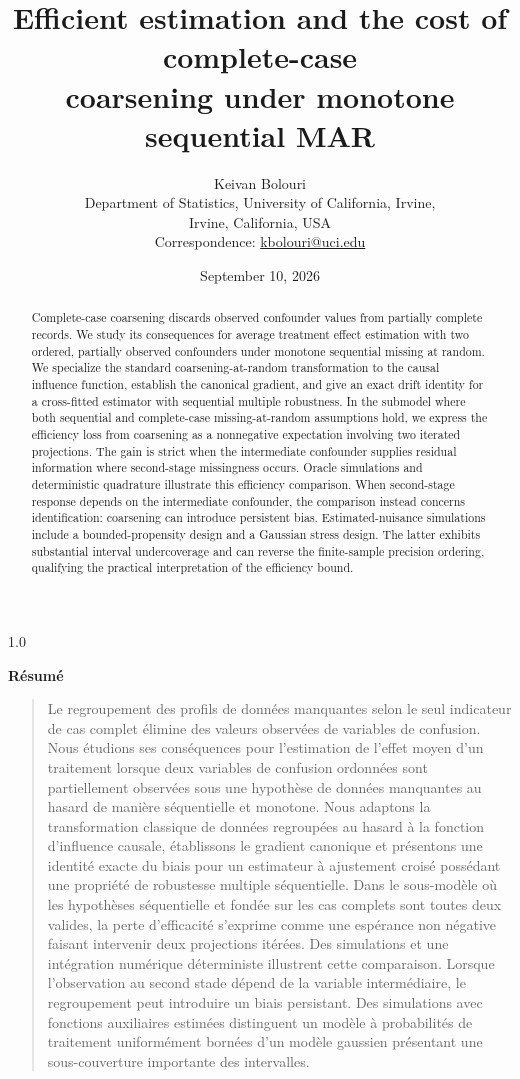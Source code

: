 \documentclass[11pt]{article}
\title{\vspace{-1.2cm}\textbf{Efficient estimation and the cost of complete-case\\ coarsening under monotone sequential MAR}}
\author{Keivan Bolouri\\
\small Department of Statistics, University of California, Irvine,\\
\small Irvine, California, USA\\[2pt]
\small Correspondence: \href{mailto:kbolouri@uci.edu}{kbolouri@uci.edu}}
\date{September 10, 2026}
\theoremstyle{definition}
\newcommand{\1}{\mathbf{1}}
\begin{document}
\maketitle


\begin{spacing}{1.0}
\begin{abstract}
Complete-case coarsening discards observed confounder values from partially complete records. We study its consequences for average treatment effect estimation with two ordered, partially observed confounders under monotone sequential missing at random. We specialize the standard coarsening-at-random transformation to the causal influence function, establish the canonical gradient, and give an exact drift identity for a cross-fitted estimator with sequential multiple robustness. In the submodel where both sequential and complete-case missing-at-random assumptions hold, we express the efficiency loss from coarsening as a nonnegative expectation involving two iterated projections. The gain is strict when the intermediate confounder supplies residual information where second-stage missingness occurs. Oracle simulations and deterministic quadrature illustrate this efficiency comparison. When second-stage response depends on the intermediate confounder, the comparison instead concerns identification: coarsening can introduce persistent bias. Estimated-nuisance simulations include a bounded-propensity design and a Gaussian stress design. The latter exhibits substantial interval undercoverage and can reverse the finite-sample precision ordering, qualifying the practical interpretation of the efficiency bound.
\end{abstract}

\begin{center}\textbf{Résumé}\end{center}
\begin{quote}\small
Le regroupement des profils de données manquantes selon le seul indicateur de cas complet élimine des valeurs observées de variables de confusion. Nous étudions ses conséquences pour l'estimation de l'effet moyen d'un traitement lorsque deux variables de confusion ordonnées sont partiellement observées sous une hypothèse de données manquantes au hasard de manière séquentielle et monotone. Nous adaptons la transformation classique de données regroupées au hasard à la fonction d'influence causale, établissons le gradient canonique et présentons une identité exacte du biais pour un estimateur à ajustement croisé possédant une propriété de robustesse multiple séquentielle. Dans le sous-modèle où les hypothèses séquentielle et fondée sur les cas complets sont toutes deux valides, la perte d'efficacité s'exprime comme une espérance non négative faisant intervenir deux projections itérées. Des simulations et une intégration numérique déterministe illustrent cette comparaison. Lorsque l'observation au second stade dépend de la variable intermédiaire, le regroupement peut introduire un biais persistant. Des simulations avec fonctions auxiliaires estimées distinguent un modèle à probabilités de traitement uniformément bornées d'un modèle gaussien présentant une sous-couverture importante des intervalles.
\end{quote}


\end{spacing}
\end{document}
